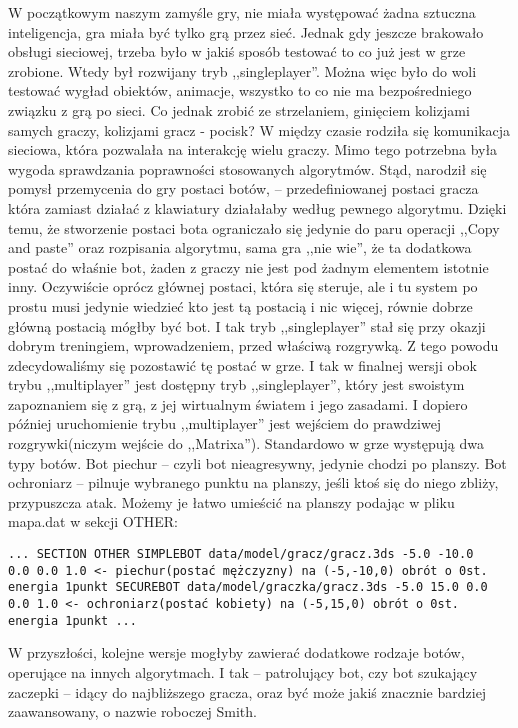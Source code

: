 \documentclass[licencjacka]{pracamgr}
\begin{document}
W początkowym naszym zamyśle gry, nie miała występować żadna sztuczna inteligencja,
gra miała być tylko grą przez sieć.
Jednak gdy jeszcze brakowało obsługi sieciowej, trzeba było w jakiś sposób testować to co już jest w grze zrobione.
Wtedy był rozwijany tryb ,,singleplayer''. Można więc było do woli testować wygład obiektów, animacje, wszystko to co
nie ma bezpośredniego związku z grą po sieci. Co jednak zrobić ze strzelaniem, ginięciem kolizjami samych graczy,
kolizjami gracz - pocisk? W między czasie rodziła się komunikacja sieciowa, która pozwalała na interakcję wielu graczy.
Mimo tego potrzebna była wygoda sprawdzania poprawności stosowanych algorytmów. Stąd, narodził się pomysł przemycenia
do gry postaci botów, -- przedefiniowanej postaci gracza która zamiast działać z klawiatury działałaby według pewnego
algorytmu. Dzięki temu, że stworzenie postaci bota ograniczało się jedynie do paru operacji ,,Copy and paste'' oraz
rozpisania algorytmu, sama gra ,,nie wie'', że ta dodatkowa postać do właśnie bot, żaden z graczy nie jest
pod żadnym elementem istotnie inny. Oczywiście oprócz głównej postaci, która się steruje, ale i tu system po prostu musi
jedynie wiedzieć kto jest tą postacią i nic więcej, równie dobrze główną postacią mógłby być bot. I tak tryb ,,singleplayer''
stał się przy okazji dobrym treningiem, wprowadzeniem, przed właściwą rozgrywką. Z tego powodu zdecydowaliśmy się pozostawić tę
postać w grze. I tak w finalnej wersji obok trybu ,,multiplayer'' jest dostępny tryb ,,singleplayer'', który jest swoistym zapoznaniem
się z grą, z jej wirtualnym światem i jego zasadami. I dopiero później uruchomienie trybu ,,multiplayer'' jest wejściem do prawdziwej
rozgrywki(niczym wejście do ,,Matrixa''). Standardowo w grze występują dwa typy botów. Bot piechur -- czyli
bot nieagresywny, jedynie chodzi po planszy. Bot ochroniarz -- pilnuje wybranego punktu na planszy,
jeśli ktoś się do niego zbliży, przypuszcza atak. Możemy je łatwo umieścić na planszy podając w pliku mapa.dat w sekcji OTHER:
\begin{verbatim}
... SECTION OTHER SIMPLEBOT data/model/gracz/gracz.3ds -5.0 -10.0
0.0 0.0 1.0 <- piechur(postać mężczyzny) na (-5,-10,0) obrót o 0st.
energia 1punkt SECUREBOT data/model/graczka/gracz.3ds -5.0 15.0 0.0
0.0 1.0 <- ochroniarz(postać kobiety) na (-5,15,0) obrót o 0st.
energia 1punkt ...
\end{verbatim}
W przyszłości, kolejne wersje mogłyby zawierać dodatkowe rodzaje botów, operujące na innych algorytmach.
I tak -- patrolujący bot, czy bot szukający zaczepki -- idący do najbliższego gracza, oraz być może jakiś
znacznie bardziej zaawansowany, o nazwie roboczej Smith.
\end{document}
